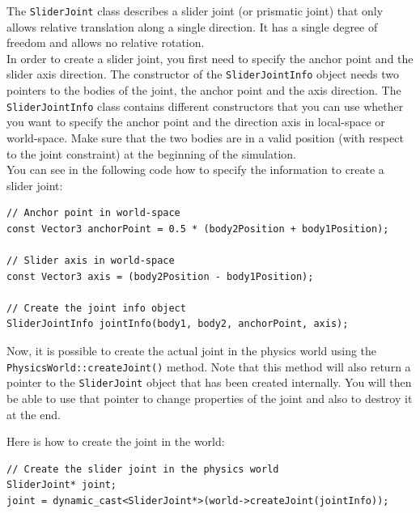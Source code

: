 \documentclass[a4paper,12pt]{article}
\begin{document}
    The \texttt{SliderJoint} class describes a slider joint (or prismatic joint) that only allows relative translation along a single direction.
    It has a single degree of freedom and allows no relative rotation. \\

    In order to create a slider joint, you first need to specify the anchor point and the slider axis direction.
    The constructor of the \texttt{SliderJointInfo} object needs two pointers to the bodies of the joint, the anchor point and the axis direction.
    The \texttt{SliderJointInfo} class contains different constructors that you can use whether you want to specify the anchor point and the direction axis
    in local-space or world-space. Make sure that the two bodies are in a valid position (with respect to the joint constraint) at the beginning
    of the simulation.\\

    You can see in the following code how to specify the information to create a slider joint: \\

    \begin{lstlisting}
// Anchor point in world-space
const Vector3 anchorPoint = 0.5 * (body2Position + body1Position);

// Slider axis in world-space
const Vector3 axis = (body2Position - body1Position);

// Create the joint info object
SliderJointInfo jointInfo(body1, body2, anchorPoint, axis);
  \end{lstlisting}

    \vspace{0.6cm}

    \begin{sloppypar}
    Now, it is possible to create the actual joint in the physics world using the \texttt{PhysicsWorld::createJoint()} method.
    Note that this method will also return a pointer to the \texttt{SliderJoint} object that has been created internally. You will then
    be able to use that pointer to change properties of the joint and also to destroy it at the end. \\
    \end{sloppypar}

    Here is how to create the joint in the world: \\

    \begin{lstlisting}
// Create the slider joint in the physics world
SliderJoint* joint;
joint = dynamic_cast<SliderJoint*>(world->createJoint(jointInfo));
  \end{lstlisting}
\end{document}
